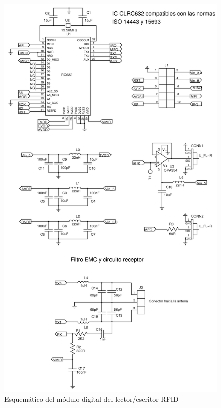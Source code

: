\begin{figure}[H]
\centering
  \begin{center}
  \includegraphics[scale=1]{Imagenes/rfid_rwd.png}
  \end{center}
  \caption{Esquemático del módulo digital del lector/escritor RFID}\label{Fig:RFID} 
\end{figure}

